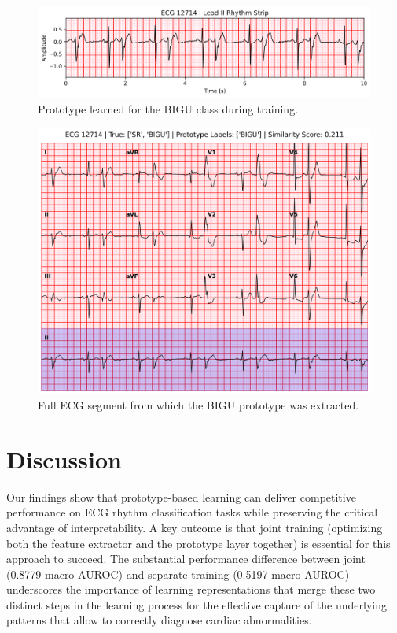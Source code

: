 \begin{figure}[h]
    \centering
    \includegraphics[width=0.7\linewidth]{images/prototype.png}
    \caption{Prototype learned for the BIGU class during training.}
    \label{fig:prototype}
\end{figure}

\begin{figure}[h]
    \centering
    \includegraphics[width=0.7\linewidth]{images/full_ecg.png}
    \caption{Full ECG segment from which the BIGU prototype was extracted.}
    \label{fig:full_ecg}
\end{figure}

\section{Discussion}

Our findings show that prototype-based learning can deliver competitive performance on ECG rhythm classification tasks while preserving the critical advantage of interpretability. A key outcome is that joint training (optimizing both the feature extractor and the prototype layer together) is essential for this approach to succeed. The substantial performance difference between joint (0.8779 macro-AUROC) and separate training (0.5197 macro-AUROC) underscores the importance of learning representations that merge these two distinct steps in the learning process for the effective capture of the underlying patterns that allow to correctly diagnose cardiac abnormalities.

